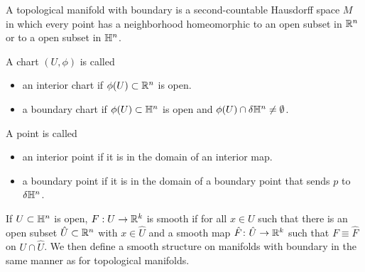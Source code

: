 \documentclass{skript}
\begin{document}
\begin{definition}\label{def:topmanfbound}
    A topological manifold with boundary is a second-countable Hausdorff space $M$ in which every point has a neighborhood homeomorphic to an open subset in $\mathbb{R}^n$ or to a open subset in $\mathbb{H}^n$.

A chart $(U,\phi)$ is called 
\begin{itemize}
    \item 
        an interior chart if $\phi(U) \subset \mathbb{R}^n$ is open.
    \item
        a boundary chart if $\phi(U)\subset \mathbb{H}^n$ is open and $\phi(U) \cap \delta\mathbb{H}^n \neq \emptyset$.
\end{itemize}
A point is called
\begin{itemize}
\item
    an interior point if it is in the domain of an interior map.
\item 
    a boundary point if it is in the domain of a boundary point that sends $p$ to $\delta \mathbb{H}^n$.
\end{itemize}
If $U\subset \mathbb{H}^n$ is open, $F:U\to \mathbb{R}^k$ is smooth if for all $x\in U$ such that there is an open subset $\hat U\subset \mathbb{R}^n$ with $x\in \hat U$ and a smooth map $\hat F\colon \hat U \to \mathbb{R}^k$ such that $F\equiv \hat F$ on $U\cap \hat U$.
We then define a smooth structure on manifolds with boundary in the same manner as for topological manifolds.

\end{definition}














\printbibliography
\end{document}
